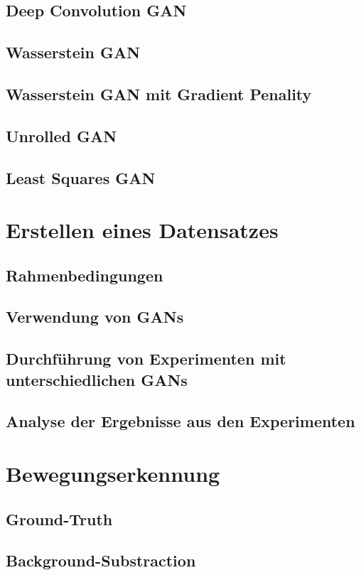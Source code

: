 \documentclass{hsflensburg}
\begin{document}
  \subsection{Deep Convolution GAN}
  \subsection{Wasserstein GAN}
  \subsection{Wasserstein GAN mit Gradient Penality}
  \subsection{Unrolled GAN}
  \subsection{Least Squares GAN}

  \section{Erstellen eines Datensatzes}
  \subsection{Rahmenbedingungen}
  \subsection{Verwendung von GANs}
  \subsection{Durchführung von Experimenten mit unterschiedlichen GANs}
  \subsection{Analyse der Ergebnisse aus den Experimenten}

  \section{Bewegungserkennung}
  \subsection{Ground-Truth}
  \subsection{Background-Substraction}
\end{document}
